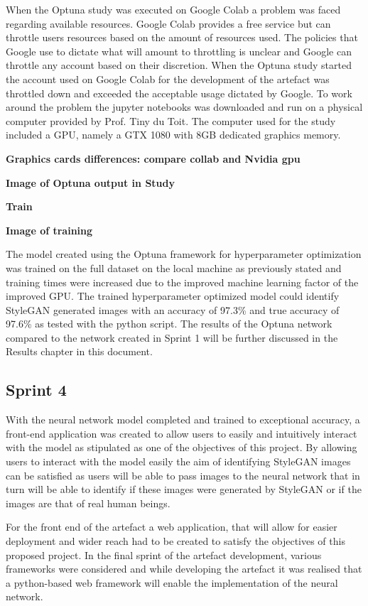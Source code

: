 When the Optuna study was executed on Google Colab a problem was faced regarding available resources. Google Colab provides a free service but can throttle users resources based on the amount of resources used. The policies that Google use to dictate what will amount to throttling is unclear and Google can throttle any account based on their discretion. When the Optuna study started the account used on Google Colab for the development of the artefact was throttled down and exceeded the acceptable usage dictated by Google. To work around the problem the jupyter notebooks was downloaded and run on a physical computer provided by Prof. Tiny du Toit. The computer used for the study included a GPU, namely a GTX 1080 with 8GB dedicated graphics memory.

\textbf{Graphics cards differences: compare collab and Nvidia gpu}

\textbf{Image of Optuna output in Study}

\textbf{Train}

\textbf{Image of training}

The model created using the Optuna framework for hyperparameter optimization was trained on the full dataset on the local machine as previously stated and training times were increased due to the improved machine learning factor of the improved GPU. The trained hyperparameter optimized model could identify StyleGAN generated images with an accuracy of 97.3\% and true accuracy of 97.6\% as tested with the python script. The results of the Optuna network compared to the network created in Sprint 1 will be further discussed in the Results chapter in this document.


\subsection{Sprint 4}

With the neural network model completed and trained to exceptional accuracy, a front-end application was created to allow users to easily and intuitively interact with the model as stipulated as one of the objectives of this project. By allowing users to interact with the model easily the aim of identifying StyleGAN images can be satisfied as users will be able to pass images to the neural network that in turn will be able to identify if these images were generated by StyleGAN or if the images are that of real human beings. 

For the front end of the artefact a web application, that will allow for easier deployment and wider reach had to be created to satisfy the objectives of this proposed project. In the final sprint of the artefact development, various frameworks were considered and while developing the artefact it was realised that a python-based web framework will enable the implementation of the neural network. 

